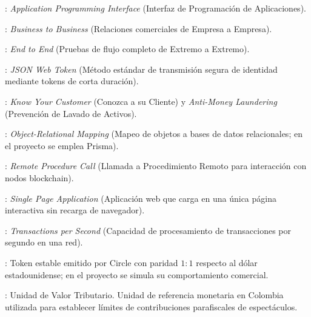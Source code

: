 \begin{description}\setlength{\itemsep}{2pt}
\item[API]: \textit{Application Programming Interface} (Interfaz de Programación de Aplicaciones).
\item[B2B]: \textit{Business to Business} (Relaciones comerciales de Empresa a Empresa).
\item[E2E]: \textit{End to End} (Pruebas de flujo completo de Extremo a Extremo).
\item[JWT]: \textit{JSON Web Token} (Método estándar de transmisión segura de identidad mediante tokens de
corta duración).
\item[KYC / AML]: \textit{Know Your Customer} (Conozca a su Cliente) y \textit{Anti-Money Laundering}
(Prevención de Lavado de Activos).
\item[ORM]: \textit{Object-Relational Mapping} (Mapeo de objetos a bases de datos relacionales; en el
proyecto se emplea Prisma).
\item[RPC]: \textit{Remote Procedure Call} (Llamada a Procedimiento Remoto para interacción con nodos
blockchain).
\item[SPA]: \textit{Single Page Application} (Aplicación web que carga en una única página interactiva sin
recarga de navegador).
\item[TPS]: \textit{Transactions per Second} (Capacidad de procesamiento de transacciones por segundo en una
red).
\item[USDC / USDC\_SIM]: Token estable emitido por Circle con paridad $1:1$ respecto al dólar estadounidense;
en el proyecto se simula su comportamiento comercial.
\item[UVT]: Unidad de Valor Tributario. Unidad de referencia monetaria en Colombia utilizada para establecer
límites de contribuciones parafiscales de espectáculos.
\end{description}


